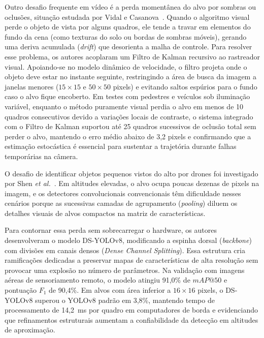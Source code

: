 Outro desafio frequente em vídeo é a perda momentânea do alvo por sombras ou oclusões, situação estudada por Vidal e Casanova~\cite{vidal2007}. Quando o algoritmo visual perde o objeto de vista por alguns quadros, ele tende a travar em elementos do fundo da cena (como texturas do solo ou bordas de sombras móveis), gerando uma deriva acumulada (\textit{drift}) que desorienta a malha de controle. Para resolver esse problema, os autores acoplaram um Filtro de Kalman recursivo ao rastreador visual. Apoiando-se no modelo dinâmico de velocidade, o filtro projeta onde o objeto deve estar no instante seguinte, restringindo a área de busca da imagem a janelas menores ($15 \times 15$ e $50 \times 50$ pixels) e evitando saltos espúrios para o fundo caso o alvo fique encoberto. Em testes com pedestres e veículos sob iluminação variável, enquanto o método puramente visual perdia o alvo em menos de 10 quadros consecutivos devido a variações locais de contraste, o sistema integrado com o Filtro de Kalman suportou até 25 quadros sucessivos de oclusão total sem perder o alvo, mantendo o erro médio abaixo de 3,2 pixels e confirmando que a estimação estocástica é essencial para sustentar a trajetória durante falhas temporárias na câmera.

O desafio de identificar objetos pequenos vistos do alto por drones foi investigado por Shen \textit{et al.}~\cite{shen2023}. Em altitudes elevadas, o alvo ocupa poucas dezenas de pixels na imagem, e os detectores convolucionais convencionais têm dificuldade nesses cenários porque as sucessivas camadas de agrupamento (\textit{pooling}) diluem os detalhes visuais de alvos compactos na matriz de características.

Para contornar essa perda sem sobrecarregar o hardware, os autores desenvolveram o modelo DS-YOLOv8, modificando a espinha dorsal (\textit{backbone}) com divisões em canais densos (\textit{Dense Channel Splitting}). Essa estrutura cria ramificações dedicadas a preservar mapas de características de alta resolução sem provocar uma explosão no número de parâmetros. Na validação com imagens aéreas de sensoriamento remoto, o modelo atingiu 91,0\% de $mAP@50$ e pontuação $F_1$ de 90,4\%. Em alvos com área inferior a $16 \times 16$ pixels, o DS-YOLOv8 superou o YOLOv8 padrão em 3,8\%, mantendo tempo de processamento de 14,2~ms por quadro em computadores de borda e evidenciando que refinamentos estruturais aumentam a confiabilidade da detecção em altitudes de aproximação.


